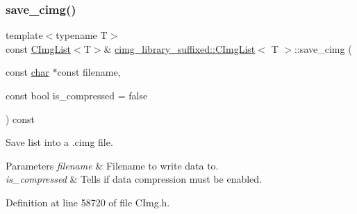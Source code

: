 \mbox{\label{structcimg__library__suffixed_1_1CImgList_a3d34d49b4dd45bfea1192ee67dcb7e85}} 
\subsubsection{\texorpdfstring{save\+\_\+cimg()}{save\_cimg()}\hspace{0.1cm}{\footnotesize\ttfamily [1/4]}}
{\footnotesize\ttfamily template$<$typename T$>$ \\
const \hyperlink{structcimg__library__suffixed_1_1CImgList}{C\+Img\+List}$<$T$>$\& \hyperlink{structcimg__library__suffixed_1_1CImgList}{cimg\+\_\+library\+\_\+suffixed\+::\+C\+Img\+List}$<$ T $>$\+::save\+\_\+cimg (\begin{DoxyParamCaption}\item[{const \hyperlink{classchar}{char} $\ast$const}]{filename,  }\item[{const bool}]{is\+\_\+compressed = {\ttfamily false} }\end{DoxyParamCaption}) const\hspace{0.3cm}{\ttfamily [inline]}}



Save list into a .cimg file. 


\begin{DoxyParams}{Parameters}
{\em filename} & Filename to write data to. \\
\hline
{\em is\+\_\+compressed} & Tells if data compression must be enabled. \\
\hline
\end{DoxyParams}


Definition at line 58720 of file C\+Img.\+h.

\mbox{\label{structcimg__library__suffixed_1_1CImgList_ab6686d16f57cd89b76c2a87ef76c067e}} 
